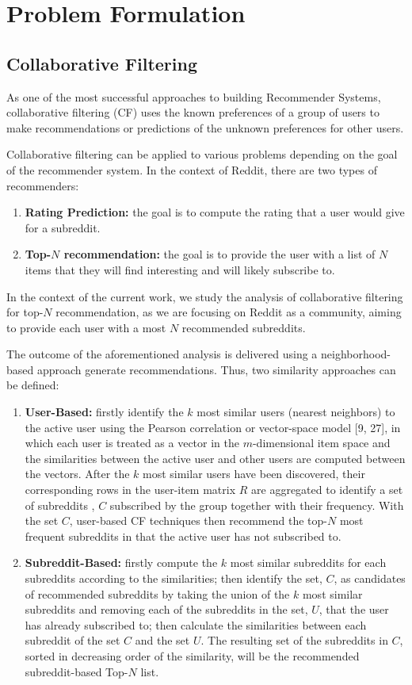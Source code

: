 \documentclass[conference, 12pt]{IEEEtran}
\newenvironment{renum}
  {\begin{enumerate}\renewcommand\labelenumi{(\roman{enumi})}}
  {\end{enumerate}}
\begin{document}
\section{Problem Formulation}
\subsection{Collaborative Filtering}
As one of the most successful approaches to building Recommender Systems, collaborative filtering (CF) uses the known preferences of a group of users to make recommendations or predictions of the unknown preferences for other users.

Collaborative filtering can be applied to various problems depending on the goal of the recommender system. In the context of Reddit, there are two types of recommenders:
\begin{renum}
\item \textbf{Rating Prediction:} the goal is to compute the rating that a user would give for a subreddit.
\item \textbf{Top-$N$ recommendation:} the goal is to provide the user with a list of $N$ items that they will find interesting and will likely subscribe to.
\end{renum}

In the context of the current work, we study the analysis of collaborative filtering for top-$N$ recommendation, as we are focusing on Reddit as a community, aiming to provide each user with a most $N$ recommended subreddits.
 
The outcome of the aforementioned analysis is delivered using a neighborhood-based approach
generate recommendations. Thus, two similarity approaches can be defined:
\begin{renum}
\item \textbf{User-Based:}  firstly identify the $k$ most similar users (nearest neighbors) to the active user using the Pearson correlation or vector-space model [9, 27], in which each user is treated as a vector in the $m$-dimensional item space and the similarities between the active user and other users are computed between the vectors. After the $k$ most similar users have been discovered, their corresponding rows in the user-item matrix $R$ are aggregated to identify a set of subreddits , $C$ subscribed by the group together with their frequency. With the set $C$, user-based CF techniques then recommend the top-$N$ most frequent subreddits in  that the active user has not subscribed to.
\item \textbf{Subreddit-Based:} firstly compute the $k$ most similar subreddits for each subreddits according to the similarities; then identify the set, $C$, as candidates of recommended subreddits by taking the union of the $k$ most similar subreddits and removing each of the subreddits in the set, $U$, that the user has already subscribed to; then calculate the similarities between each subreddit of the set $C$ and the set $U$. The resulting set of the subreddits in $C$, sorted in decreasing order of the similarity, will be the recommended subreddit-based Top-$N$ list.
\end{renum}
\end{document}
